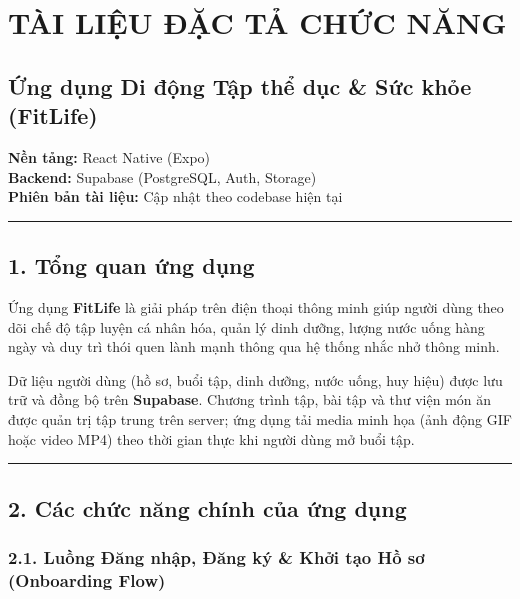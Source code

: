 \documentclass[12pt,a4paper]{article}
\date{\today}
\begin{document}
\section{TÀI LIỆU ĐẶC TẢ CHỨC
NĂNG}\label{tuxe0i-liux1ec7u-ux111ux1eb7c-tux1ea3-chux1ee9c-nux103ng}

\subsection{Ứng dụng Di động Tập thể dục \& Sức khỏe
(FitLife)}\label{ux1ee9ng-dux1ee5ng-di-ux111ux1ed9ng-tux1eadp-thux1ec3-dux1ee5c-sux1ee9c-khux1ecfe-fitlife}

\textbf{Nền tảng:} React Native (Expo)\\
\textbf{Backend:} Supabase (PostgreSQL, Auth, Storage)\\
\textbf{Phiên bản tài liệu:} Cập nhật theo codebase hiện tại

\begin{center}\rule{0.5\linewidth}{0.5pt}\end{center}

\subsection{1. Tổng quan ứng
dụng}\label{tux1ed5ng-quan-ux1ee9ng-dux1ee5ng}

Ứng dụng \textbf{FitLife} là giải pháp trên điện thoại thông minh giúp
người dùng theo dõi chế độ tập luyện cá nhân hóa, quản lý dinh dưỡng,
lượng nước uống hàng ngày và duy trì thói quen lành mạnh thông qua hệ
thống nhắc nhở thông minh.

Dữ liệu người dùng (hồ sơ, buổi tập, dinh dưỡng, nước uống, huy hiệu)
được lưu trữ và đồng bộ trên \textbf{Supabase}. Chương trình tập, bài
tập và thư viện món ăn được quản trị tập trung trên server; ứng dụng tải
media minh họa (ảnh động GIF hoặc video MP4) theo thời gian thực khi
người dùng mở buổi tập.

\begin{center}\rule{0.5\linewidth}{0.5pt}\end{center}

\subsection{2. Các chức năng chính của ứng
dụng}\label{cuxe1c-chux1ee9c-nux103ng-chuxednh-cux1ee7a-ux1ee9ng-dux1ee5ng}

\subsubsection{2.1. Luồng Đăng nhập, Đăng ký \& Khởi tạo Hồ sơ
(Onboarding
Flow)}\label{luux1ed3ng-ux111ux103ng-nhux1eadp-ux111ux103ng-kuxfd-khux1edfi-tux1ea1o-hux1ed3-sux1a1-onboarding-flow}
\end{document}
